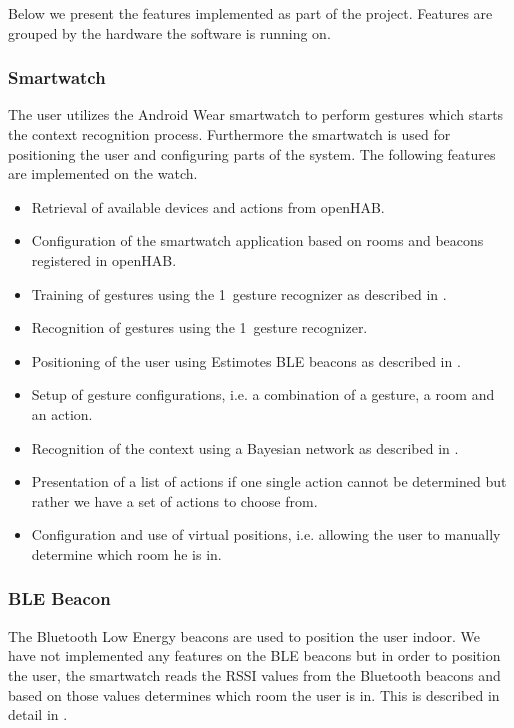 Below we present the features implemented as part of the project. Features are grouped by the hardware the software is running on.

\subsubsection{Smartwatch}

The user utilizes the Android Wear smartwatch to perform gestures which starts the context recognition process. Furthermore the smartwatch is used for positioning the user and configuring parts of the system. The following features are implemented on the watch.

\begin{itemize}
\item Retrieval of available devices and actions from openHAB.
\item Configuration of the smartwatch application based on rooms and beacons registered in openHAB.
\item Training of gestures using the 1\textcent~gesture recognizer as described in .
\item Recognition of gestures using the 1\textcent~gesture recognizer.
\item Positioning of the user using Estimotes BLE beacons as described in .
\item Setup of gesture configurations, i.e. a combination of a gesture, a room and an action.
\item Recognition of the context using a Bayesian network as described in .
\item Presentation of a list of actions if one single action cannot be determined but rather we have a set of actions to choose from.
\item Configuration and use of virtual positions, i.e. allowing the user to manually determine which room he is in.
\end{itemize}

\subsubsection{BLE Beacon}

The Bluetooth Low Energy beacons are used to position the user indoor. We have not implemented any features on the BLE beacons but in order to position the user, the smartwatch reads the RSSI values from the Bluetooth beacons and based on those values determines which room the user is in. This is described in detail in .

